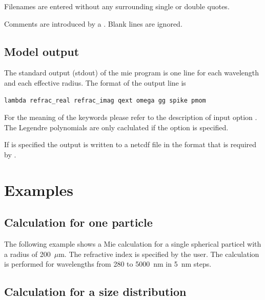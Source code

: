 Filenames are entered without any surrounding single or double quotes.

Comments are introduced by a \code{\#}. Blank lines are ignored.

\subsection{Model output}

The standard output (stdout) of the mie program is one line for each 
wavelength and each effective radius.
The format of the output line is
\begin{Verbatim}[fontsize=\footnotesize, frame=single, samepage=true]   
  lambda refrac_real refrac_imag qext omega gg spike pmom
\end{Verbatim}
For the meaning of the keywords please refer to the description of input option
. The Legendre polynomials  are only
caclulated if the option  is specified.

If  is specified the output is written to a
netcdf file in the format that is required by .

\section{Examples}

\subsection{Calculation for one particle}

The following example shows a Mie calculation for a single spherical
particel with a radius of 200~$\mu$m. The refractive index is
specified by the user. The calculation is performed for wavelengths
from 280 to 5000~nm in 5~nm steps.

\subsection{Calculation for a size distribution}

